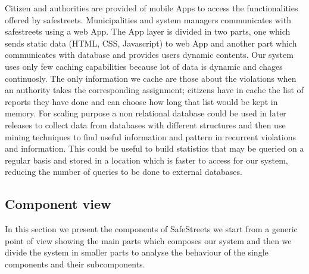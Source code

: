 Citizen and authorities are provided of mobile Apps to access the functionalities offered by safestreets. Municipalities and system managers communicates with safestreets using a web App.
The App layer is divided in two parts, one which sends static data (HTML, CSS, Javascript) to web App and another part which communicates with database and provides users dynamic contents.
Our system uses only few caching capabilities because lot of data is dynamic and chages continuosly. 
The only information we cache are those about the violations when an authority takes the corresponding assignment; citizens have in cache the list of reports they have done and can choose how long that list would be kept in memory.
For scaling purpose a non relational database could be used in later releases to collect data from databases with different structures and then use mining techniques to find useful information and pattern in recurrent violations and information. This could be useful to build statistics that may be queried on a regular basis and stored in a location which is faster to access for our system, reducing the number of queries to be done to external databases.


\subsection{Component view}
In this section we present the components of SafeStreets we start from a generic point of view showing the main parts which composes our system and then we divide the system in smaller parts to analyse the behaviour of the single components and their subcomponents.
